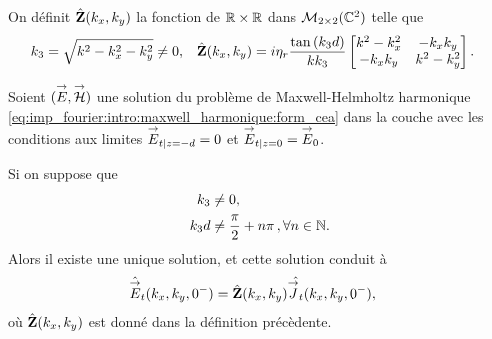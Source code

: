         \begin{defn}
          \label{def:plan:impedance:1c}
          On définit \(\hat {\mathbf{Z}}(k_x,k_y)\) la fonction de \(\mathbb R \times \mathbb R\) dans \(\mathcal{M}_{2\times2}(\mathbb C^2)\) telle que
          \begin{align*}
            k_3 &= \sqrt{k^2 - k_x^2 -k_y^2} \not = 0,
            &
            \hat {\mathbf{Z}}(k_x,k_y) &= i\eta_r\dfrac{\tan\left(k_3d\right)}{k k_3}
            \begin{bmatrix}
              k^2-k_x^2  & -k_xk_y
              \\
              -k_xk_y & k^2-k_y^2
            \end{bmatrix}.
          \end{align*}
        \end{defn}
        \begin{prop}
          \label{prop:imp_plan:symb_z:1c}
          Soient \(({\overset{\rightarrow}{E}},{\overset{\rightarrow}{\mathcal{H}}})\) une solution du problème de Maxwell-Helmholtz harmonique \eqref{eq:imp_fourier:intro:maxwell_harmonique:form_cea} dans la couche avec les conditions aux limites \({\overset{\rightarrow}{E}}_{t|z=-d} = 0\) et \({\overset{\rightarrow}{E}}_{t|z=0} = {\overset{\rightarrow}{E}}_0\).
  
          Si on suppose que
          \begin{align*}
            k_3     & \not = 0, \\
            k_3d    & \not = \dfrac{\pi}{2}+n\pi\,, \forall n \in \mathbb N.
          \end{align*}
          Alors il existe une unique solution, et cette solution conduit à
          \begin{align*}
            \hat {{\overset{\rightarrow}{E}}}_t(k_x,k_y,0^-) &= \hat {\mathbf{Z}}(k_x,k_y)\hat{{\overset{\rightarrow}{J}}_t}(k_x,k_y,0^-),
          \end{align*}
          où \(\hat {\mathbf{Z}}(k_x,k_y)\) est donné dans la définition précèdente.
        \end{prop}


